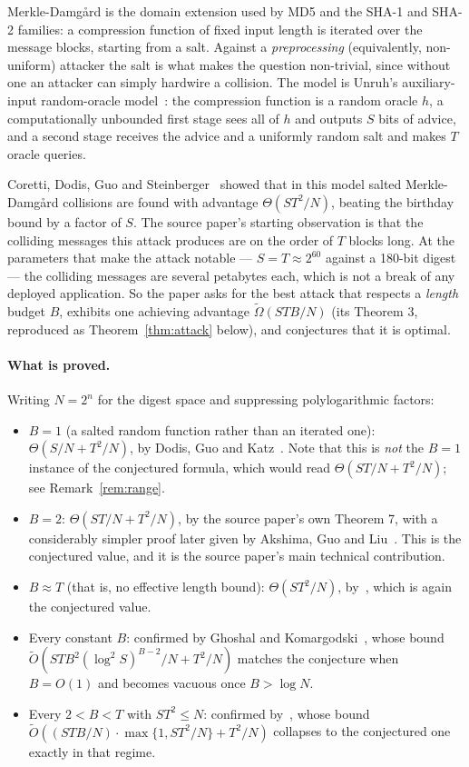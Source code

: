 \documentclass{aicr-conjecture}
\newcommand{\tO}{\tilde{O}}
\newcommand{\tOm}{\tilde{\Omega}}
\begin{document}
Merkle-Damg\aa{}rd is the domain extension used by MD5 and the SHA-1
and SHA-2 families: a compression function of fixed input length is
iterated over the message blocks, starting from a salt. Against a
\emph{preprocessing} (equivalently, non-uniform) attacker the salt is
what makes the question non-trivial, since without one an attacker can
simply hardwire a collision. The model is Unruh's auxiliary-input
random-oracle model~\cite{Unr07}: the compression function is a random
oracle $h$, a computationally unbounded first stage sees all of $h$ and
outputs $S$ bits of advice, and a second stage receives the advice and
a uniformly random salt and makes $T$ oracle queries.

Coretti, Dodis, Guo and Steinberger~\cite{CDGS18} showed that in this
model salted Merkle-Damg\aa{}rd collisions are found with advantage
$\Theta(ST^{2}/N)$, beating the birthday bound by a factor of $S$. The
source paper's starting observation is that the colliding messages this
attack produces are on the order of $T$ blocks long. At the parameters
that make the attack notable --- $S = T \approx 2^{60}$ against a
180-bit digest --- the colliding messages are several petabytes each,
which is not a break of any deployed application. So the paper asks for
the best attack that respects a \emph{length} budget $B$, exhibits one
achieving advantage $\tOm(STB/N)$ (its Theorem 3, reproduced as
Theorem~\ref{thm:attack} below), and conjectures that it is optimal.

\paragraph{What is proved.}
Writing $N = 2^{n}$ for the digest space and suppressing
polylogarithmic factors:

\begin{itemize}
\item $B = 1$ (a salted random function rather than an iterated one):
  $\Theta(S/N + T^{2}/N)$, by Dodis, Guo and Katz~\cite{DGK17}. Note
  that this is \emph{not} the $B = 1$ instance of the conjectured
  formula, which would read $\Theta(ST/N + T^{2}/N)$; see
  Remark~\ref{rem:range}.
\item $B = 2$: $\Theta(ST/N + T^{2}/N)$, by the source paper's own
  Theorem 7, with a considerably simpler proof later given by Akshima,
  Guo and Liu~\cite{AGL22}. This is the conjectured value, and it is
  the source paper's main technical contribution.
\item $B \approx T$ (that is, no effective length bound):
  $\Theta(ST^{2}/N)$, by~\cite{CDGS18}, which is again the conjectured
  value.
\item Every constant $B$: confirmed by Ghoshal and
  Komargodski~\cite{GK22}, whose bound
  $\tO(STB^{2}(\log^{2}S)^{B-2}/N + T^{2}/N)$ matches the conjecture
  when $B = O(1)$ and becomes vacuous once $B > \log N$.
\item Every $2 < B < T$ with $ST^{2} \le N$: confirmed
  by~\cite{AGL22}, whose bound
  $\tO((STB/N)\cdot\max\{1, ST^{2}/N\} + T^{2}/N)$ collapses to the
  conjectured one exactly in that regime.
\end{itemize}
\end{document}
